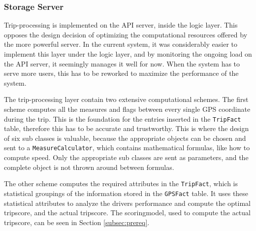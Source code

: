 \subsubsection{Storage Server}\label{subsec:impl_storage_server}
Trip-processing is implemented on the API server, inside the logic layer. This opposes the design decision of optimizing the computational resources offered by the more powerful server. In the current system, it was considerably easier to implement this layer under the logic layer, and by monitoring the ongoing load on the API server, it seemingly manages it well for now. When the system has to serve more users, this has to be reworked to maximize the performance of the system. 

The trip-processing layer contain two extensive computational schemes. The first scheme computes all the measures and flags between every single GPS coordinate during the trip. This is the foundation for the entries inserted in the \texttt{TripFact} table, therefore this has to be accurate and trustworthy. This is where the design of six sub classes is valuable, because the appropriate objects can be chosen and sent to a \texttt{MeasureCalculator}, which contains mathematical formulas, like how to compute speed. Only the appropriate sub classes are sent as parameters, and the complete object is not thrown around between formulas.

The other scheme computes the required attributes in the \texttt{TripFact}, which is statistical groupings of the information stored in the \texttt{GPSFact} table. It uses these statistical attributes to analyze the drivers performance and compute the optimal tripscore, and the actual tripscore. The scoringmodel, used to compute the actual tripscore, can be seen in Section \ref{subsec:prereq}.